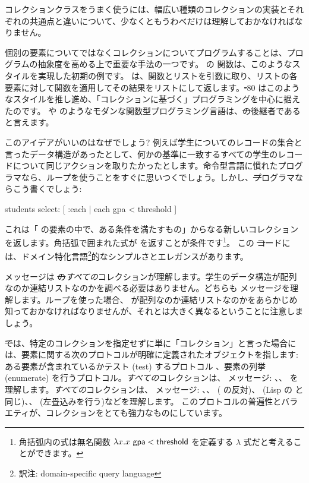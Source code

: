 \documentclass[a4paper,10pt,twoside]{book}
\begin{document}
コレクションクラスをうまく使うには、幅広い種類のコレクションの実装とそれぞれの共通点と違いについて、少なくともうわべだけは理解しておかなければなりません。

個別の要素についてではなくコレクションについてプログラムすることは、プログラムの抽象度を高める上で重要な手法の一つです。
 の  関数は、このようなスタイルを実現した初期の例です。 は、関数とリストを引数に取り、リストの各要素に対して関数を適用してその結果をリストにして返します。\st-80 はこのようなスタイルを推し進め、「コレクションに基づく」プログラミングを中心に据えたのです。 や  のようなモダンな関数型プログラミング言語は、\st の後継者であると言えます。%

このアイデアがいいのはなぜでしょう?
例えば学生についてのレコードの集合と言ったデータ構造があったとして、何かの基準に一致するすべての学生のレコードについて同じアクションを取りたかったとします。命令型言語に慣れたプログラマなら、ループを使うことをすぐに思いつくでしょう。しかし、\st プログラマならこう書くでしょう:
\begin{code}{}
students select: [ :each | each gpa < threshold ]
\end{code}
\noindent
これは「 の要素の中で、ある条件を満たすもの」からなる新しいコレクションを返します。角括弧で囲まれた式が  を返すことが条件です\footnote{角括弧内の式は無名関数 $\lambda x. x~{\sf gpa} < {\sf threshold}$ を定義する $\lambda$ 式だと考えることができます。%
}。
この \st コードには、ドメイン特化言語\footnote{訳注: domain-specific query language}的なシンプルさとエレガンスがあります。

 メッセージは \st の\emph{すべての}コレクションが理解します。学生のデータ構造が配列なのか連結リストなのかを調べる必要はありません。どちらも  メッセージを理解します。ループを使った場合、 が配列なのか連結リストなのかをあらかじめ知っておかなければなりませんが、それとは大きく異なるということに注意しましょう。%

\st では、特定のコレクションを指定せずに単に「コレクション」と言った場合には、要素に関する次のプロトコルが明確に定義されたオブジェクトを指します: ある要素が含まれているかテスト (test) するプロトコル 、要素の列挙 (enumerate) を行うプロトコル。\emph{すべての}コレクションは、 メッセージ: \mbox{、}\mbox{、} を理解します。\emph{すべての}コレクションは、 メッセージ: 、、 ( の反対)、 (Lisp の と同じ)、、 (左畳込みを行う)などを理解します。
このプロトコルの普遍性とバラエティが、コレクションをとても強力なものにしています。
\end{document}
